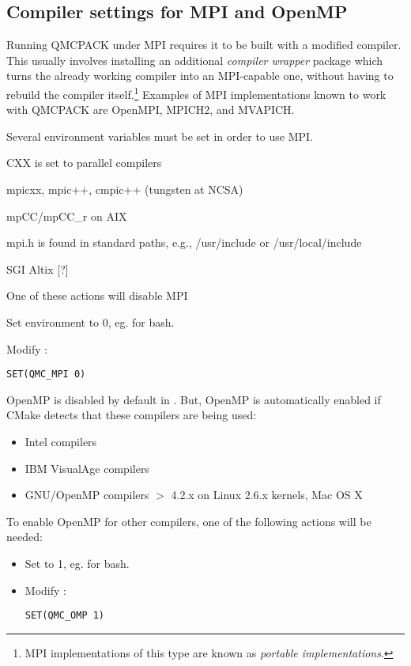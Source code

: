 \subsection{Compiler settings for MPI and OpenMP} \label{ss:compset}
Running QMCPACK under MPI requires it to be built with a modified compiler.  This usually involves installing an additional \emph{compiler wrapper} package which turns the already working compiler into an MPI-capable one, without having to rebuild the compiler itself.\footnote{MPI implementations of this type are known as \emph{portable implementations}.}  Examples of MPI implementations known to work with QMCPACK are OpenMPI, MPICH2, and MVAPICH.

Several environment variables must be set in order to use MPI.
\begin{itemize*}
  \item{} CXX is set to parallel compilers
  \begin{itemize*}
    \item{} mpicxx, mpic++, cmpic++ (tungsten at NCSA)
    \item{} mpCC/mpCC\_r on AIX 
  \end{itemize*}
  \item{} mpi.h is found in standard paths, e.g., /usr/include or /usr/local/include
  \begin{itemize*}
    \item{} SGI Altix  [?]
  \end{itemize*}
\end{itemize*}
One of these actions will disable MPI
\begin{itemize*}
  \item{} Set  environment to 0, eg.  for bash.
  \item{} Modify :
\begin{verbatim}
SET(QMC_MPI 0)
\end{verbatim}
\end{itemize*}

OpenMP is disabled by default in .  But, OpenMP is automatically enabled if CMake detects that these compilers are being used:
\begin{itemize}
  \item{} Intel compilers
  \item{} IBM VisualAge compilers
  \item{} GNU/OpenMP compilers $>$ 4.2.x on Linux 2.6.x kernels, Mac OS X 
\end{itemize}
To enable OpenMP for other compilers, one of the following actions will be needed:
\begin{itemize}
  \item{} Set  to 1, eg.  for bash.
  \item{} Modify :
\begin{verbatim}
SET(QMC_OMP 1)
\end{verbatim}
\end{itemize}

